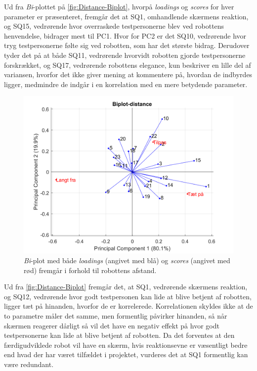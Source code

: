 Ud fra \textit{Bi}-plottet på \autoref{fig:Distance-Biplot}, hvorpå \textit{loadings} og \textit{scores} for hver parameter er præsenteret, fremgår det at SQ1, omhandlende skærmens reaktion, og SQ15, vedrørende hvor overraskede testpersonerne blev ved robottens henvendelse, bidrager mest til PC1. Hvor for PC2 er det SQ10, vedrørende hvor tryg testpersonerne følte sig ved robotten, som har det største bidrag. Derudover tyder det på at både SQ11, vedrørende hvorvidt robotten gjorde testpersonerne forskrækket, og SQ17, vedrørende robottens elegance, kun beskriver en lille del af variansen, hvorfor det ikke giver mening at kommentere på, hvordan de indbyrdes ligger, medmindre de indgår i en korrelation med en mere betydende parameter.   
%
\begin{figure}[H]
\centering
\includegraphics[width=\textwidth]{Figure/DatabehandlingSkalaer/PCAfigures/Distance-Biplot.png}
\caption{\textit{Bi}-plot med både \textit{loadings} (angivet med blå) og \textit{scores} (angivet med rød) fremgår i forhold til robottens afstand.}
\label{fig:Distance-Biplot}
\end{figure}
\noindent
%
Ud fra \autoref{fig:Distance-Biplot} fremgår det, at SQ1, vedrørende skærmens reaktion, og SQ12, vedrørende hvor godt testpersonen kan lide at blive betjent af robotten, ligger tæt på hinanden, hvorfor de er korrelerede. Korrelationen skyldes ikke at de to parametre måler det samme, men formentlig påvirker hinanden, så når skærmen reagerer dårligt så vil det have en negativ effekt på hvor godt testpersonerne kan lide at blive betjent af robotten. Da det forventes at den færdigudviklede robot vil have en skærm, hvis reaktionsevne er væsentligt bedre end hvad der har været tilfældet i projektet, vurderes det at SQ1 formentlig kan være redundant. 

